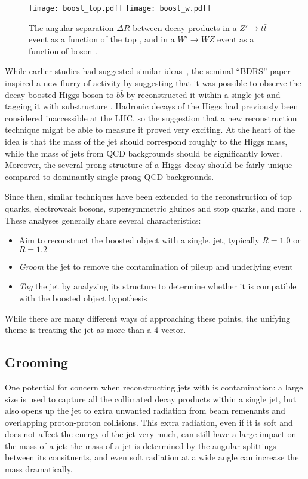 
\begin{figure}
\centering
\texttt{[image: boost\_top.pdf]}
\texttt{[image: boost\_w.pdf]}
\label{fig:jets:boost}
\caption{The angular separation $\Delta R$ between decay products in a $Z'\rightarrow t\bar{t}$ event as a function of the top \pt, and in a $W'\rightarrow WZ$ event as a function of boson \pt.}
\end{figure}




While earlier studies had suggested similar ideas~, the seminal ``BDRS'' paper inspired a new flurry of activity by suggesting that it was possible to observe the decay boosted Higgs boson to $b\bar{b}$ by reconstructed  it within a single jet and tagging it with substructure \cite{BDRS}. Hadronic decays of the Higgs had previously been considered inaccessible at the LHC, so the suggestion that a new reconstruction technique might be able to measure it proved very exciting. At the heart of the idea is that the mass of the jet should correspond roughly to the Higgs mass, while the mass of jets from QCD backgrounds should be significantly lower. Moreover, the several-prong structure of a Higgs decay should be fairly unique compared to dominantly single-prong QCD backgrounds.

Since then, similar techniques have been extended to the reconstruction of top quarks, electroweak bosons, supersymmetric gluinos and stop quarks, and more~. These analyses generally share several characteristics:
%
\begin{itemize}
\item Aim to reconstruct the boosted object with a single, \largeR jet, typically $R=1.0$ or $R=1.2$
\item \textit{Groom} the jet to remove the contamination of pileup and underlying event 
\item \textit{Tag} the jet by analyzing its structure to determine whether it is compatible with the boosted object hypothesis
\end{itemize}
%
While there are many different ways of approaching these points, the unifying theme is treating the jet as more than a 4-vector. 

\subsection{Grooming}
One potential for concern when reconstructing jets with \largeR is contamination: a large size is used to capture all the collimated decay products within a single jet, but also opens up the jet to extra unwanted radiation from beam remenants and overlapping proton-proton collisions. This extra radiation, even if it is soft and does not affect the energy of the jet very much, can still have a large impact on the mass of a jet: the mass of a jet is determined by the angular splittings between its consituents, and even soft radiation at a wide angle can increase the mass dramatically.

